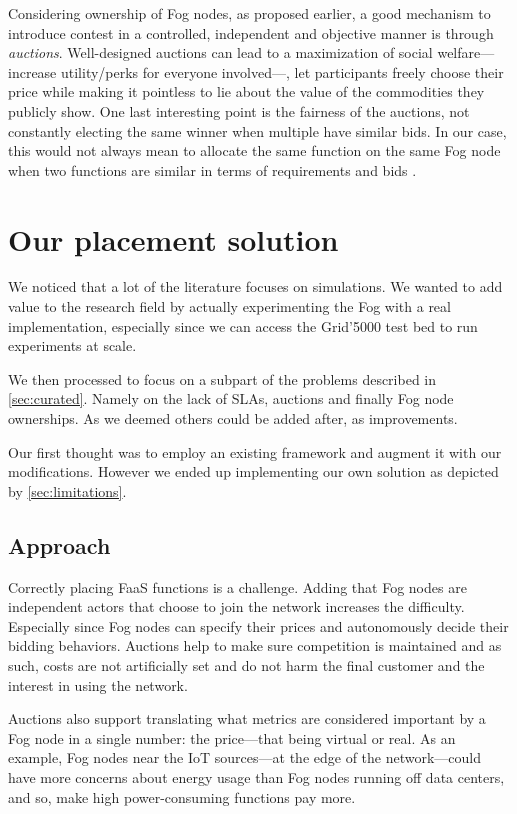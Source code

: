 Considering ownership of Fog nodes, as proposed earlier, a good mechanism to introduce contest in a controlled, independent and objective manner is through \emph{auctions}. Well-designed auctions can lead to a maximization of social welfare—increase utility/perks for everyone involved—, let participants freely choose their price while making it pointless to lie about the value of the commodities they publicly show. One last interesting point is the fairness of the auctions, not constantly electing the same winner when multiple have similar bids. In our case, this would not always mean to allocate the same function on the same Fog node when two functions are similar in terms of requirements and bids \cite{kuo_proportionnet_2020}.

\section{Our placement solution}
\label{sec:ourplacementsol}

We noticed that a lot of the literature focuses on simulations. We wanted to add value to the research field by actually experimenting the Fog with a real implementation, especially since we can access the Grid’5000 test bed \cite{noauthor_getting_nodate} to run experiments at scale.

We then processed to focus on a subpart of the problems described in \cref{sec:curated}. Namely on the lack of \glspl{SLA}, auctions and finally Fog node ownerships. As we deemed others could be added after, as improvements.

Our first thought was to employ an existing framework and augment it with our modifications. However we ended up implementing our own solution as depicted by \cref{sec:limitations}.

\subsection{Approach}

Correctly placing \gls{FaaS} functions is a challenge. Adding that Fog nodes are independent actors that choose to join the network increases the difficulty. Especially since Fog nodes can specify their prices and autonomously decide their bidding behaviors. Auctions help to make sure competition is maintained and as such, costs are not artificially set and do not harm the final customer and the interest in using the network.

Auctions also support translating what metrics are considered important by a Fog node in a single number: the price—that being virtual or real. As an example, Fog nodes near the \gls{IoT} sources—at the edge of the network—could have more concerns about energy usage than Fog nodes running off data centers, and so, make high power-consuming functions pay more.

